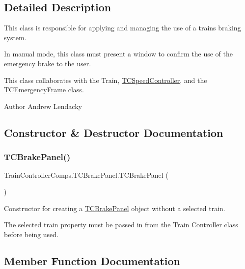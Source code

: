 \subsection{Detailed Description}
This class is responsible for applying and managing the use of a train\textquotesingle{}s braking system. 

In manual mode, this class must present a window to confirm the use of the emergency brake to the user.

This class collaborates with the Train, \hyperlink{classTrainControllerComps_1_1TCSpeedController}{T\+C\+Speed\+Controller}, and the \hyperlink{classTrainControllerComps_1_1TCEmergencyFrame}{T\+C\+Emergency\+Frame} class.

\begin{DoxyAuthor}{Author}
Andrew Lendacky 
\end{DoxyAuthor}


\subsection{Constructor \& Destructor Documentation}
\mbox{\label{classTrainControllerComps_1_1TCBrakePanel_a5940e47f6529fb96044ba90413906b30}} 
\subsubsection{\texorpdfstring{T\+C\+Brake\+Panel()}{TCBrakePanel()}}
{\footnotesize\ttfamily Train\+Controller\+Comps.\+T\+C\+Brake\+Panel.\+T\+C\+Brake\+Panel (\begin{DoxyParamCaption}{ }\end{DoxyParamCaption})}



Constructor for creating a \hyperlink{classTrainControllerComps_1_1TCBrakePanel}{T\+C\+Brake\+Panel} object without a selected train. 

The selected train property must be passed in from the Train Controller class before being used. 

\subsection{Member Function Documentation}
\mbox{\label{classTrainControllerComps_1_1TCBrakePanel_a14938e5fe8d51e9f556097d274fa5b92}} 
